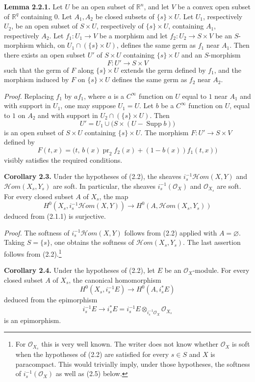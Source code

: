 \textbf{Lemma 2.2.1.} Let $U$ be an open subset of $\mathbb R^n$, and let $V$ be a convex open subset of $\mathbb R^q$ containing $0$. Let $A_1,A_2$ be closed subsets of $\{s\}\times U$. Let $U_1$, respectively $U_2$, be an open subset of $S\times U$, respectively of $\{s\}\times U$, containing $A_1$, respectively $A_2$. Let $f_1:U_1\to V$ be a morphism and let $f_2:U_2\to S\times V$ be an $S$-morphism which, on $U_1\cap(\{s\}\times U)$, defines the same germ as $f_1$ near $A_1$. Then there exists an open subset $U'$ of $S\times U$ containing $\{s\}\times U$ and an $S$-morphism
\[
 F:U'\longrightarrow S\times V
\]
such that the germ of $F$ along $\{s\}\times U$ extends the germ defined by $f_1$, and the morphism induced by $F$ on $\{s\}\times U$ defines the same germ as $f_2$ near $A_2$.

\emph{Proof.} Replacing $f_1$ by $af_1$, where $a$ is a $C^\infty$ function on $U$ equal to $1$ near $A_1$ and with support in $U_1$, one may suppose $U_1=U$. Let $b$ be a $C^\infty$ function on $U$, equal to $1$ on $A_2$ and with support in $U_2\cap(\{s\}\times U)$. Then
\[
 U' = U_1\cup\bigl(S\times (U-\operatorname{Supp}b)\bigr)
\]
is an open subset of $S\times U$ containing $\{s\}\times U$. The morphism $F:U'\to S\times V$ defined by
\[
 F(t,x)=\bigl(t,\,b(x)\operatorname{pr}_2 f_2(x)+(1-b(x))f_1(t,x)\bigr)
\]
visibly satisfies the required conditions.

\textbf{Corollary 2.3.} Under the hypotheses of (2.2), the sheaves $i_s^{-1}\mathcal Hom(X,Y)$ and $\mathcal Hom(X_s,Y_s)$ are soft. In particular, the sheaves $i_s^{-1}(\mathcal O_X)$ and $\mathcal O_{X_s}$ are soft. For every closed subset $A$ of $X_s$, the map
\[
 H^0(X_s,i_s^{-1}\mathcal Hom(X,Y))\longrightarrow H^0(A,\mathcal Hom(X_s,Y_s))
\]
deduced from (2.1.1) is surjective.

\emph{Proof.} The softness of $i_s^{-1}\mathcal Hom(X,Y)$ follows from (2.2) applied with $A=\varnothing$. Taking $S=\{s\}$, one obtains the softness of $\mathcal Hom(X_s,Y_s)$. The last assertion follows from (2.2).\footnote{For $\mathcal O_{X_s}$ this is very well known. The writer does not know whether $\mathcal O_X$ is soft when the hypotheses of (2.2) are satisfied for every $s\in S$ and $X$ is paracompact. This would trivially imply, under those hypotheses, the softness of $i_s^{-1}(\mathcal O_X)$ as well as (2.5) below.}

\textbf{Corollary 2.4.} Under the hypotheses of (2.2), let $E$ be an $\mathcal O_X$-module. For every closed subset $A$ of $X_s$, the canonical homomorphism
\[
 H^0(X_s,i_s^{-1}E)\longrightarrow H^0(A,i_s^*E)
\]
deduced from the epimorphism
\[
 i_s^{-1}E\longrightarrow i_s^*E=i_s^{-1}E\otimes_{i_s^{-1}\mathcal O_X}\mathcal O_{X_s}
\]
is an epimorphism.

